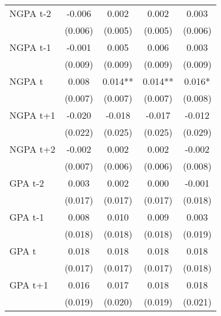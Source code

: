 {{\begin{tabular}{lcccc}
NGPA t-2            &      -0.006   &       0.002   &       0.002   &       0.003   \\
                    &     (0.006)   &     (0.005)   &     (0.005)   &     (0.006)   \\
 
NGPA t-1            &      -0.001   &       0.005   &       0.006   &       0.003   \\
                    &     (0.009)   &     (0.009)   &     (0.009)   &     (0.009)   \\
 
NGPA t              &       0.008   &       0.014** &       0.014** &       0.016*  \\
                    &     (0.007)   &     (0.007)   &     (0.007)   &     (0.008)   \\
 
NGPA t+1            &      -0.020   &      -0.018   &      -0.017   &      -0.012   \\
                    &     (0.022)   &     (0.025)   &     (0.025)   &     (0.029)   \\
 
NGPA t+2            &      -0.002   &       0.002   &       0.002   &      -0.002   \\
                    &     (0.007)   &     (0.006)   &     (0.006)   &     (0.008)   \\
 
GPA t-2             &       0.003   &       0.002   &       0.000   &      -0.001   \\
                    &     (0.017)   &     (0.017)   &     (0.017)   &     (0.018)   \\
 
GPA t-1             &       0.008   &       0.010   &       0.009   &       0.003   \\
                    &     (0.018)   &     (0.018)   &     (0.018)   &     (0.019)   \\
 
GPA t               &       0.018   &       0.018   &       0.018   &       0.018   \\
                    &     (0.017)   &     (0.017)   &     (0.017)   &     (0.018)   \\
 
GPA t+1             &       0.016   &       0.017   &       0.018   &       0.018   \\
                    &     (0.019)   &     (0.020)   &     (0.019)   &     (0.021)   \\
 

\end{tabular}}}
